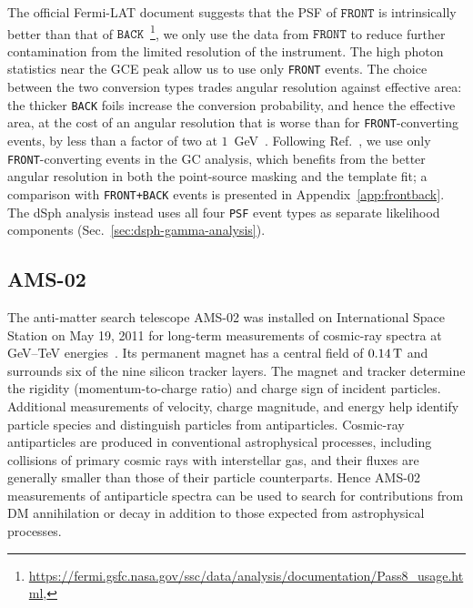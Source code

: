 \documentclass[superscriptaddress,
showpacs,preprintnumbers,nofootinbib,eqsecnum,amsmath,amssymb,aps,11pt, groupedaddress, floatfix]{revtex4-2}
\begin{document}
The official Fermi-LAT document suggests that the PSF of $\texttt{FRONT}$ is intrinsically better than that of $\texttt{BACK}$~\footnote{\url{https://fermi.gsfc.nasa.gov/ssc/data/analysis/documentation/Pass8_usage.html}, }, we only use the data from $\texttt{FRONT}$ to reduce further contamination from the limited resolution of the instrument. 
The high photon statistics near the GCE peak allow us to use only \texttt{FRONT} events.
The choice between the two conversion types trades angular resolution against effective area: the thicker \texttt{BACK} foils increase the conversion probability, and hence the effective area, at the cost of an angular resolution that is worse than for \texttt{FRONT}-converting events, by less than a factor of two at $1$~GeV~\cite{Fermi-LAT:2009ihh}. Following Ref.~\cite{Cholis:2021rpp}, we use only \texttt{FRONT}-converting events in the GC analysis, which benefits from the better angular resolution in both the point-source masking and the template fit; a comparison with \texttt{FRONT+BACK} events is presented in Appendix~\ref{app:frontback}. The dSph analysis instead uses all four \texttt{PSF} event types as separate likelihood components (Sec.~\ref{sec:dsph-gamma-analysis}).







\subsection{AMS-02}


The anti-matter search telescope AMS-02 was installed on International Space Station on May 19, 2011 for long-term measurements of cosmic-ray spectra at GeV–TeV energies~\cite{AMS:2021nhj}.
Its permanent magnet has a central field of $0.14\,{\rm T}$ and surrounds six of the nine silicon tracker layers.
The magnet and tracker determine the rigidity (momentum-to-charge ratio) and charge sign of incident particles.
Additional measurements of velocity, charge magnitude, and energy help identify particle species and distinguish particles from antiparticles.
Cosmic-ray antiparticles are produced in conventional astrophysical processes, including collisions of primary cosmic rays with interstellar gas, and their fluxes are generally smaller than those of their particle counterparts.
Hence AMS-02 measurements of antiparticle spectra can be used to search for contributions from DM annihilation or decay in addition to those expected from astrophysical processes.
\end{document}
